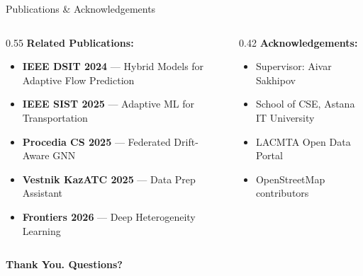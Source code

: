 \documentclass[aspectratio=169, 11pt]{beamer}
\begin{document}
\begin{frame}{Publications \& Acknowledgements}
\vspace{0.3em}
\begin{columns}[T]
\begin{column}{0.55\textwidth}
\textbf{Related Publications:}
\small
\begin{itemize}
  \item \textbf{IEEE DSIT 2024} --- Hybrid Models for Adaptive Flow Prediction
  \item \textbf{IEEE SIST 2025} --- Adaptive ML for Transportation
  \item \textbf{Procedia CS 2025} --- Federated Drift-Aware GNN
  \item \textbf{Vestnik KazATC 2025} --- Data Prep Assistant
  \item \textbf{Frontiers 2026} --- Deep Heterogeneity Learning
\end{itemize}
\end{column}
\begin{column}{0.42\textwidth}
\textbf{Acknowledgements:}
\small
\begin{itemize}
  \item Supervisor: Aivar Sakhipov
  \item School of CSE, Astana IT University
  \item LACMTA Open Data Portal
  \item OpenStreetMap contributors
\end{itemize}
\end{column}
\end{columns}

\vspace{1.2em}
\begin{center}
\textbf{\Large Thank You. Questions?}
\end{center}
\end{frame}
\end{document}
